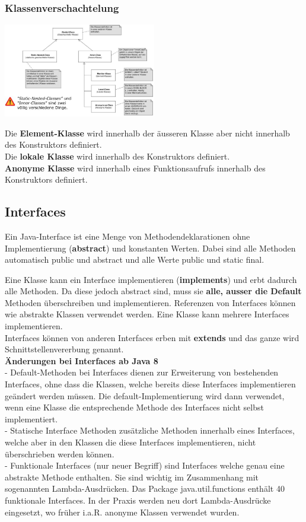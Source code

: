 \subsubsection{Klassenverschachtelung}

\includegraphics[width=0.50\textwidth]{Loes/NestedClass.jpg}

Die \textbf{Element-Klasse} wird innerhalb der äusseren Klasse aber nicht innerhalb des Konstruktors definiert. \\ 
Die \textbf{lokale Klasse} wird innerhalb des Konstruktors definiert. \\
\textbf{Anonyme Klasse} wird innerhalb eines Funktionsaufrufs innerhalb des Konstruktors definiert. \\

\subsection{Interfaces}
Ein Java-Interface ist eine Menge von Methodendeklarationen ohne Implementierung (\textbf{abstract}) und konstanten Werten. Dabei sind alle Methoden automatisch public und abstract und alle Werte public und static final.

Eine Klasse kann ein Interface implementieren (\textbf{implements}) und erbt dadurch alle Methoden. Da diese jedoch abstract sind, muss sie \textbf{alle, ausser die Default} Methoden überschreiben und implementieren. Referenzen von Interfaces können wie abstrakte Klassen verwendet werden. Eine Klasse kann mehrere Interfaces implementieren.\\
Interfaces können von anderen Interfaces erben mit \textbf{extends} und das ganze wird Schnittstellenvererbung genannt. \\

\textbf{Änderungen bei Interfaces ab Java 8}\\
- Default-Methoden bei Interfaces dienen zur Erweiterung von bestehenden Interfaces, ohne dass die Klassen, welche bereits diese Interfaces implementieren geändert werden müssen. Die default-Implementierung wird dann verwendet, wenn eine Klasse die entsprechende Methode des Interfaces nicht selbst implementiert. \\
- Statische Interface Methoden zusätzliche Methoden innerhalb eines Interfaces, welche aber in den Klassen die diese Interfaces implementieren, nicht überschrieben werden können.\\
- Funktionale Interfaces (nur neuer Begriff) sind Interfaces welche genau eine abstrakte Methode enthalten. Sie sind wichtig im Zusammenhang mit sogenannten Lambda-Ausdrücken. Das Package java.util.functions enthält 40 funktionale Interfaces. In der Praxis werden neu dort Lambda-Ausdrücke eingesetzt, wo früher i.a.R. anonyme Klassen verwendet wurden.  


